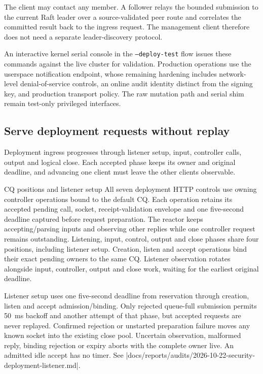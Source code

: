 The client may contact any member. A follower relays the bounded submission to
the current Raft leader over a source-validated peer route and correlates the
committed result back to the ingress request. The management client therefore
does not need a separate leader-discovery protocol.

An interactive kernel serial console in the \texttt{--deploy-test} flow issues
these commands against the live cluster for validation. Production operations
use the userspace notification endpoint, whose remaining hardening includes
network-level denial-of-service controls, an online audit identity distinct
from the signing key, and production transport policy. The raw mutation path
and serial shim remain test-only privileged interfaces.

\subsection{Serve deployment requests without replay}

Deployment ingress progresses through listener setup, input, controller calls,
output and logical close. Each accepted phase keeps its owner and original
deadline, and advancing one client must leave the other clients observable.

\begin{implementationdetail}{CQ positions and listener setup}
All seven deployment HTTP controls use owning controller operations bound to
the default CQ. Each operation retains its accepted pending call, socket,
receipt-validation envelope and one five-second deadline captured before
request preparation. The reactor keeps accepting/parsing inputs and observing
other replies while one controller request remains outstanding. Listening,
input, control, output and close phases share four positions, including listener
setup. Creation, listen and accept operations bind their exact pending owners to
the same CQ. Listener observation rotates alongside input, controller, output
and close work, waiting for the earliest original deadline.

Listener setup uses one five-second deadline from reservation through creation,
listen and accept admission/binding. Only rejected queue-full submission permits
50~ms backoff and another attempt of that phase, but accepted requests are never
replayed. Confirmed rejection or unstarted preparation failure moves any known
socket into the existing close pool. Uncertain observation, malformed reply,
binding rejection or expiry aborts with the complete owner live. An admitted idle
accept has no timer. See
\repofile|docs/reports/audits/2026-10-22-security-deployment-listener.md|.
\end{implementationdetail}

